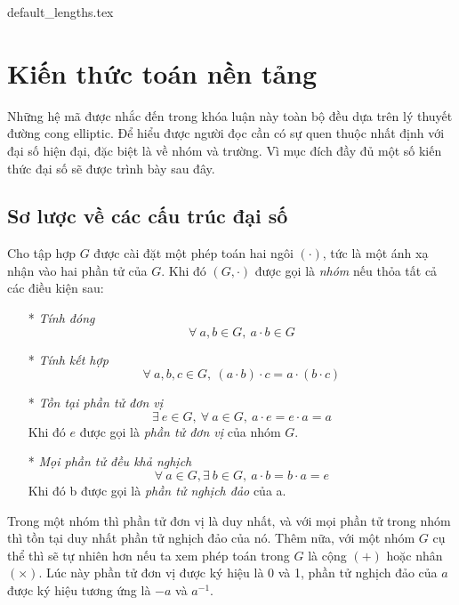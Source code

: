\documentclass[class=report, crop=false]{standalone}
\begin{document}
	{default_lengths.tex}
	\chapter{Kiến thức toán nền tảng}
		Những hệ mã được nhắc đến trong khóa luận này toàn bộ đều dựa trên lý thuyết đường cong elliptic. Để hiểu được người đọc cần có sự quen thuộc nhất định với đại số hiện đại, đặc biệt là về nhóm và trường. Vì mục đích đầy đủ một số kiến thức đại số sẽ được trình bày sau đây.
	\section{Sơ lược về các cấu trúc đại số}
		\begin{definition}
			Cho tập hợp $G$ được cài đặt một phép toán hai ngôi $(\cdot)$, tức là một ánh xạ nhận vào hai phần tử của $G$. Khi đó $(G, \cdot)$ được gọi là \textit{nhóm} nếu thỏa tất cả các điều kiện sau:
			\vspace{-0.5cm}
			\begin{itemize}
				\item[*] \textit{Tính đóng}
				\[
					\forall\ a, b \in G, \ a \cdot b \in G
				\]
				\item[*] \textit{Tính kết hợp}
				\[
					\forall\ a, b, c \in G, \ (a \cdot b) \cdot c = a \cdot (b \cdot c)
				\]
				\item[*] \textit{Tồn tại phần tử đơn vị}
				\[
					\exists\ e \in G, \ \forall\ a \in G, \ a \cdot e = e \cdot a = a
				\]
				Khi đó $e$ được gọi là \textit{phần tử đơn vị} của nhóm $G$.
				\item[*] \textit{Mọi phần tử đều khả nghịch}
				\[
					\forall\ a \in G, \exists\ b \in G, \ a \cdot b = b \cdot a = e
				\]
				Khi đó b được gọi là \textit{phần tử nghịch đảo} của a.
			\end{itemize}
		\end{definition}
		\begin{remark}
			Trong một nhóm thì phần tử đơn vị là duy nhất, và với mọi phần tử trong nhóm thì tồn tại duy nhất phần tử nghịch đảo của nó. Thêm nữa, với một nhóm $G$ cụ thể thì sẽ tự nhiên hơn nếu ta xem phép toán trong $G$ là cộng $(+)$ hoặc nhân $(\times)$. Lúc này phần tử đơn vị được ký hiệu là 0 và 1, phần tử nghịch đảo của $a$ được ký hiệu tương ứng là $-a$ và $a^{-1}$.
		\end{remark}
		
\end{document}
